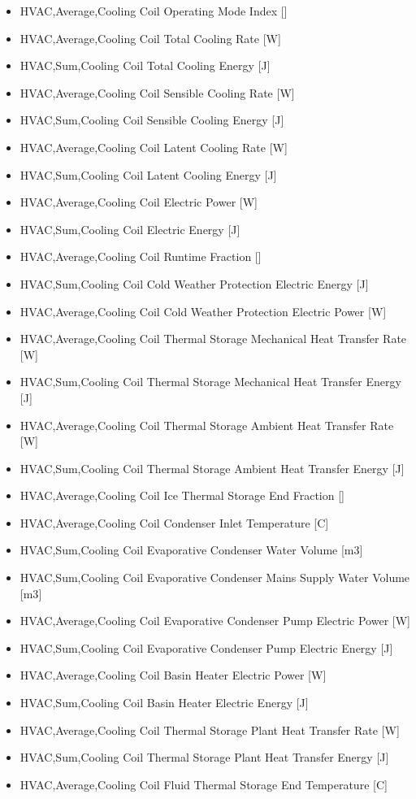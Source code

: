 \begin{itemize}
\item
  HVAC,Average,Cooling Coil Operating Mode Index {[]}
\item
  HVAC,Average,Cooling Coil Total Cooling Rate {[}W{]}
\item
  HVAC,Sum,Cooling Coil Total Cooling Energy {[}J{]}
\item
  HVAC,Average,Cooling Coil Sensible Cooling Rate {[}W{]}
\item
  HVAC,Sum,Cooling Coil Sensible Cooling Energy {[}J{]}
\item
  HVAC,Average,Cooling Coil Latent Cooling Rate {[}W{]}
\item
  HVAC,Sum,Cooling Coil Latent Cooling Energy {[}J{]}
\item
  HVAC,Average,Cooling Coil Electric Power {[}W{]}
\item
  HVAC,Sum,Cooling Coil Electric Energy {[}J{]}
\item
  HVAC,Average,Cooling Coil Runtime Fraction {[]}
\item
  HVAC,Sum,Cooling Coil Cold Weather Protection Electric Energy {[}J{]}
\item
  HVAC,Average,Cooling Coil Cold Weather Protection Electric Power {[}W{]}
\item
  HVAC,Average,Cooling Coil Thermal Storage Mechanical Heat Transfer Rate {[}W{]}
\item
  HVAC,Sum,Cooling Coil Thermal Storage Mechanical Heat Transfer Energy {[}J{]}
\item
  HVAC,Average,Cooling Coil Thermal Storage Ambient Heat Transfer Rate {[}W{]}
\item
  HVAC,Sum,Cooling Coil Thermal Storage Ambient Heat Transfer Energy {[}J{]}
\item
  HVAC,Average,Cooling Coil Ice Thermal Storage End Fraction {[]}
\item
  HVAC,Average,Cooling Coil Condenser Inlet Temperature {[}C{]}
\item
  HVAC,Sum,Cooling Coil Evaporative Condenser Water Volume {[}m3{]}
\item
  HVAC,Sum,Cooling Coil Evaporative Condenser Mains Supply Water Volume {[}m3{]}
\item
  HVAC,Average,Cooling Coil Evaporative Condenser Pump Electric Power {[}W{]}
\item
  HVAC,Sum,Cooling Coil Evaporative Condenser Pump Electric Energy {[}J{]}
\item
  HVAC,Average,Cooling Coil Basin Heater Electric Power {[}W{]}
\item
  HVAC,Sum,Cooling Coil Basin Heater Electric Energy {[}J{]}
\item
  HVAC,Average,Cooling Coil Thermal Storage Plant Heat Transfer Rate {[}W{]}
\item
  HVAC,Sum,Cooling Coil Thermal Storage Plant Heat Transfer Energy {[}J{]}
\item
  HVAC,Average,Cooling Coil Fluid Thermal Storage End Temperature {[}C{]}
\end{itemize}

